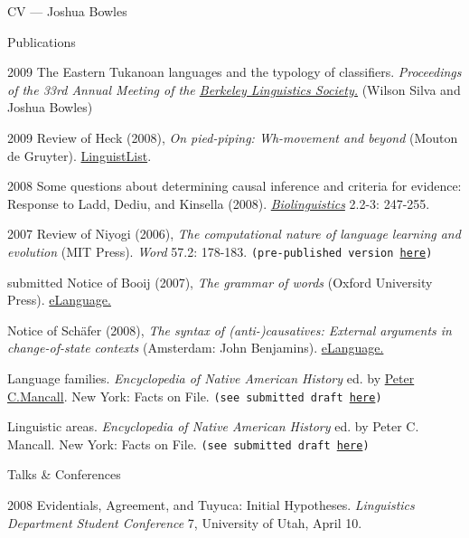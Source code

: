 \begin{cv}{CV --- Joshua Bowles}
\begin{cvlist}{Publications}
\item[2009] The Eastern Tukanoan languages and the typology of classifiers. \emph{Proceedings of the 33rd
Annual Meeting of the \href{http://linguistics.berkeley.edu/BLS/past_meetings.html}{Berkeley
Linguistics Society.}} (Wilson Silva and Joshua Bowles)

\item[2009] Review of Heck (2008), \emph{On pied-piping: Wh-movement and beyond} (Mouton de
Gruyter). \href{http://linguistlist.org/issues/20/20-2283.html}{LinguistList}.

\item[2008] Some questions about determining causal inference and criteria for evidence:
Response to Ladd, Dediu, and Kinsella (2008).
\emph{\href{http://www.biolinguistics.eu.}{Biolinguistics}} 2.2-3: 247-255.

\item[2007] Review of Niyogi (2006), \emph{The computational nature of language learning and
evolution} (MIT Press). {\it Word} 57.2: 178-183. \texttt{(pre-published version
\href{http://sites.google.com/site/bowleslinguistics/Home/research/teaching-1/publications}{here})}

\item[submitted] Notice of Booij (2007), \emph{The grammar of words} (Oxford University Press).
\href{http://www.elanguage.net/home.php}{eLanguage.}

\item Notice of Sch\"afer (2008), \emph{The syntax of (anti-)causatives: External arguments in
change-of-state contexts} (Amsterdam: John Benjamins).
\href{http://www.elanguage.net/home.php}{eLanguage.}

\item Language families. \emph{Encyclopedia of Native American History} ed. by
\href{http://college.usc.edu/faculty/faculty1003494.html}{Peter C.Mancall}. New York: Facts on File.
\texttt{(see submitted draft
\href{http://sites.google.com/site/bowleslinguistics/Home/research/teaching-1/publications}{here})}

\item Linguistic areas. \emph{Encyclopedia of Native American History} ed. by Peter C. Mancall. New
York: Facts on File. \texttt{(see submitted draft
\href{http://sites.google.com/site/bowleslinguistics/Home/research/teaching-1/publications}{here})}
\end{cvlist}

\begin{cvlist}{Talks \& Conferences}
\item[2008] Evidentials, Agreement, and Tuyuca: Initial Hypotheses. \emph{Linguistics Department
Student Conference} 7, University of Utah, April 10.


\end{cvlist}
\end{cv}
